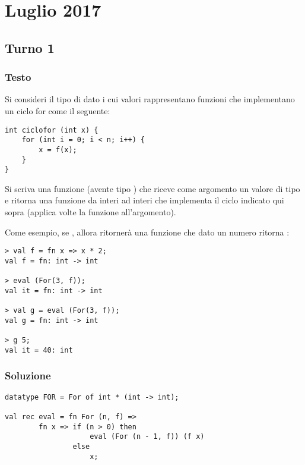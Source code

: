 \section{Luglio 2017}

\subsection{Turno 1}

\subsubsection{Testo}

Si consideri il tipo di dato  i cui valori  rappresentano funzioni che implementano un ciclo for come il seguente:

\begin{lstlisting}
int ciclofor (int x) {
	for (int i = 0; i < n; i++) {
		x = f(x);
	}
}
\end{lstlisting}

Si scriva una funzione  (avente tipo ) che riceve come argomento un valore di tipo  e ritorna una funzione da interi ad interi che implementa il ciclo indicato qui sopra (applica  volte la funzione  all'argomento).

\medskip
Come esempio, se , allora  ritornerà una funzione che dato un numero  ritorna :

\begin{lstlisting}[style = SML]
> val f = fn x => x * 2;
val f = fn: int -> int

> eval (For(3, f));
val it = fn: int -> int

> val g = eval (For(3, f));
val g = fn: int -> int

> g 5;
val it = 40: int
\end{lstlisting}

\subsubsection{Soluzione}

\begin{lstlisting}[style = SML, caption = {definizione della funzione \sml{eval}}]
datatype FOR = For of int * (int -> int);

val rec eval = fn For (n, f) =>
		fn x => if (n > 0) then
					eval (For (n - 1, f)) (f x)
				else
					x;
\end{lstlisting}

